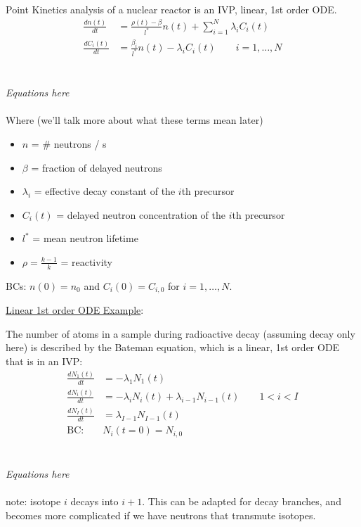 \documentclass[12pt, answers]{exam}
\begin{document}
Point Kinetics analysis of a nuclear reactor is an IVP, linear, 1st order ODE.
%
\ifprintanswers
\begin{align}
\frac{dn(t)}{dt} &= \frac{\rho(t) - \beta}{l^*}n(t) + \sum_{i=1}^{N} \lambda_i C_i(t) \nonumber \\
%
\frac{dC_i(t)}{dt} &= \frac{\beta_i}{l^*}n(t) - \lambda_i C_i(t) \qquad i=1,\dots,N \nonumber
\end{align}
\else
 \\ \\ 
 \hspace*{8em}\textit{Equations here}\\ \\
\fi
%
Where (we'll talk  more about what these terms mean later)
%
\begin{itemize}
\item $n$ = \# neutrons / s
\item $\beta$ = fraction of delayed neutrons
\item $\lambda_i$ = effective decay constant of the $i$th precursor
\item $C_i(t)$ = delayed neutron concentration of the $i$th precursor
\item $l^*$ = mean neutron lifetime
\item $\rho = \frac{k-1}{k}$ = reactivity
\end{itemize}
%
BCs: $n(0) = n_0$ and $C_i(0) = C_{i,0}$ for $i=1,\dots,N$.

\vspace*{1em}
\noindent \underline{Linear 1st order ODE Example}:

The number of atoms in a sample during radioactive decay (assuming decay only here) is described by the Bateman equation, which is a linear, 1st order ODE that is in an IVP:
%
\ifprintanswers
\begin{align}
\frac{dN_1(t)}{dt} &= -\lambda_1 N_1(t) \nonumber \\
\frac{dN_i(t)}{dt} &= -\lambda_i N_i(t) + \lambda_{i-1}N_{i-1}(t) \qquad 1 < i < I \nonumber\\
\frac{dN_I(t)}{dt} &= \lambda_{I-1} N_{I-1}(t) \nonumber \\
\text{BC: }& N_i(t=0) = N_{i,0}\nonumber
\end{align}
\else
 \\ \\ 
 \hspace*{8em}\textit{Equations here}\\ \\
\fi
%
note: isotope $i$ decays into $i+1$. This can be adapted for decay branches, and becomes more complicated if we have neutrons that transmute isotopes. 
\end{document}
